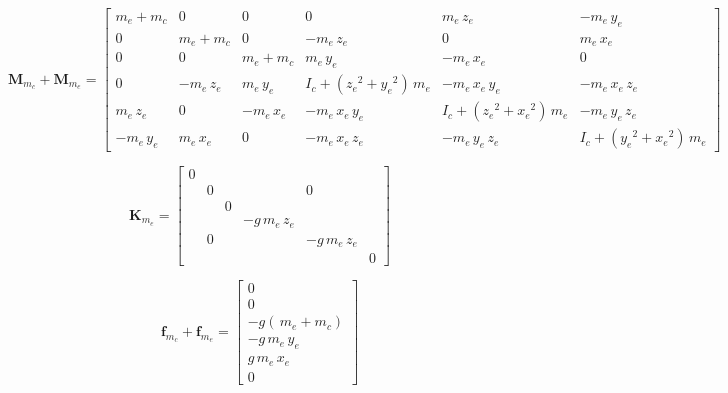 \documentclass{article}
\begin{document}
\begin{small}
    \begin{equation}
        \mathbf{M}_{m_c} + \mathbf{M}_{m_e}  = 
        \begin{bmatrix}
         m_{e}+m_{c} & 0 & 0 & 0 & m_{e}\,z_{e} & -m_{e}\,y_{e}\\ 0 & m_{e}+m_{c} & 0 & -m_{e}\,z_{e} & 0 & m_{e}\,x_{e}\\ 0 & 0 & m_{e}+m_{c} & m_{e}\,y_{e} & -m_{e}\,x_{e} & 0\\ 0 & -m_{e}\,z_{e} & m_{e}\,y_{e} & I_{c}+\left({z_{e}}^2+{y_{e}}^2\right)\,m_{e} & -m_{e}\,x_{e}\,y_{e} & -m_{e}\,x_{e}\,z_{e}\\ m_{e}\,z_{e} & 0 & -m_{e}\,x_{e} & -m_{e}\,x_{e}\,y_{e} & I_{c}+\left({z_{e}}^2+{x_{e}}^2\right)\,m_{e} & -m_{e}\,y_{e}\,z_{e}\\ -m_{e}\,y_{e} & m_{e}\,x_{e} & 0 & -m_{e}\,x_{e}\,z_{e} & -m_{e}\,y_{e}\,z_{e} & I_{c}+\left({y_{e}}^2+{x_{e}}^2\right)\,m_{e} 
        \end{bmatrix}
        \label{eq:fea:Mtop}
    \end{equation}
\end{small}

\begin{small}
    \begin{equation}
        \mathbf{K}_{m_e} =
        \begin{bmatrix}
       0 &  &  &   &   &   \\ &  0 &  &   & 0  &   \\ &   &  0 &  &   &   \\ & &   &  -g\,m_{e}\,z_{e} &  &   \\ &   0  &   &   &  -g\,m_{e}\,z_{e} &  \\ &   &   &   &   &  0
        \end{bmatrix}
        \label{eq:fea:K_m_ecc}
    \end{equation}
\end{small}

\begin{small}
    \begin{equation}
        \mathbf{f}_{m_c} + \mathbf{f}_{m_e} = 
        \begin{bmatrix}
         0\\ 0\\ -g(\,m_{e}+m_{c})\\ -g\,m_{e}\,y_{e}\\ g\,m_{e}\,x_{e} \\ 0
        \end{bmatrix}
        \label{eq:fea:Fstat}
    \end{equation}
\end{small}
\end{document}
